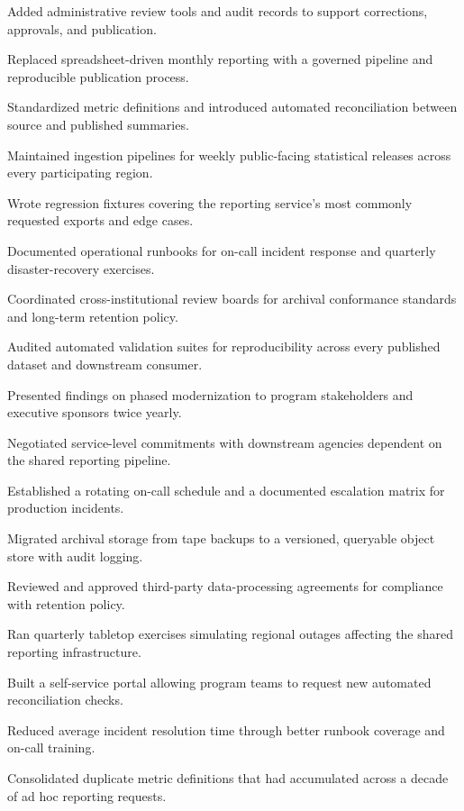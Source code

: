\documentclass[fontsize=11pt, margin=narrow, medium=print]{careerdossier-resume}
\begin{document}
\begin{CDossierEntry}[title = {Modernization Program}, organization = {Continental Reliability Consortium}, location = {Ottawa, ON}, dates = {2019--Present}]
\begin{CDossierItemize}
    \item Added administrative review tools and audit records to support corrections, approvals, and publication.
    \item Replaced spreadsheet-driven monthly reporting with a governed pipeline and reproducible publication process.
    \item Standardized metric definitions and introduced automated reconciliation between source and published summaries.
    \item Maintained ingestion pipelines for weekly public-facing statistical releases across every participating region.
    \item Wrote regression fixtures covering the reporting service's most commonly requested exports and edge cases.
    \item Documented operational runbooks for on-call incident response and quarterly disaster-recovery exercises.
    \item Coordinated cross-institutional review boards for archival conformance standards and long-term retention policy.
    \item Audited automated validation suites for reproducibility across every published dataset and downstream consumer.
    \item Presented findings on phased modernization to program stakeholders and executive sponsors twice yearly.
    \item Negotiated service-level commitments with downstream agencies dependent on the shared reporting pipeline.
    \item Established a rotating on-call schedule and a documented escalation matrix for production incidents.
    \item Migrated archival storage from tape backups to a versioned, queryable object store with audit logging.
    \item Reviewed and approved third-party data-processing agreements for compliance with retention policy.
    \item Ran quarterly tabletop exercises simulating regional outages affecting the shared reporting infrastructure.
    \item Built a self-service portal allowing program teams to request new automated reconciliation checks.
    \item Reduced average incident resolution time through better runbook coverage and on-call training.
    \item Consolidated duplicate metric definitions that had accumulated across a decade of ad hoc reporting requests.

\end{CDossierItemize}
\end{CDossierEntry}
\end{document}
